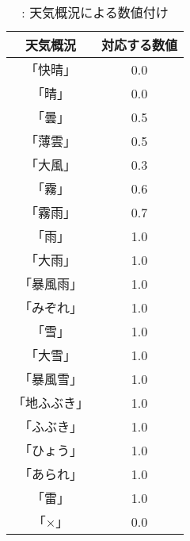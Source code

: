 
\begin{table}[t]
\centering
  \caption{: 天気概況による数値付け}
  \vspace{3mm}
  \begin{tabular}{|c|c|} \hline
    天気概況 & 対応する数値 \\ \hline \hline
    「快晴」 & 0.0 \\ \hline
    「晴」 & 0.0 \\ \hline
    「曇」 & 0.5 \\ \hline
    「薄雲」 & 0.5 \\ \hline
    「大風」 & 0.3 \\ \hline
    「霧」 & 0.6 \\ \hline
    「霧雨」 & 0.7 \\ \hline
    「雨」 & 1.0 \\ \hline
    「大雨」 & 1.0 \\ \hline
    「暴風雨」 & 1.0 \\ \hline
    「みぞれ」 & 1.0 \\ \hline
    「雪」 & 1.0 \\ \hline
    「大雪」 & 1.0 \\ \hline
    「暴風雪」 & 1.0 \\ \hline
    「地ふぶき」 & 1.0 \\ \hline
    「ふぶき」 & 1.0 \\ \hline
    「ひょう」 & 1.0 \\ \hline
    「あられ」 & 1.0 \\ \hline
    「雷」 & 1.0 \\ \hline
    「×」 & 0.0 \\ \hline
  \end{tabular}
\end{table}
%
